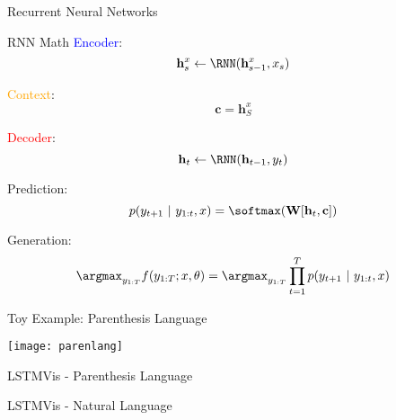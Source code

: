 \begin{frame}{Recurrent Neural Networks}
  \vspace{-0.25cm}

  \begin{center}
  \end{center}
\end{frame}


\begin{frame}{RNN Math}
  \textcolor{blue}{Encoder}:
  \[{\mathbf{h}^{x}_s \gets \RNN(\mathbf{h}^{x}_{s-1}, x_s)} \]

  \textcolor{orange}{Context}:
  \[ {\mathbf{c}} = \mathbf{h}^{x}_S \]

  \textcolor{red}{Decoder}:
  \[{\mathbf{h}_t \gets \RNN(\mathbf{h}_{t-1}, y_t)} \]

  Prediction:
  \[ p(y_{t+1}\  |\  y_{1:t}, x) = \softmax( \mathbf{W} [\mathbf{h}_t, \mathbf{c}]) \]

  \pause 

  Generation:
  \[ \argmax_{y_{1:T}} f(y_{1:T}; x, \theta) = \argmax_{y_{1:T}} \prod_{t=1}^T p(y_{t+1}\  |\  y_{1:t}, x) \] 

\end{frame}

\begin{frame}{Toy Example: Parenthesis Language}
  \begin{center}
    \texttt{[image: parenlang]}
  \end{center}
\end{frame}

\begin{frame}{LSTMVis - Parenthesis Language}
  \vspace{-0.25cm}

  \begin{center}
  \end{center}
\end{frame}


\begin{frame}{LSTMVis - Natural Language}
  \vspace{-0.25cm}


  \begin{center}
  \end{center}
\end{frame}


